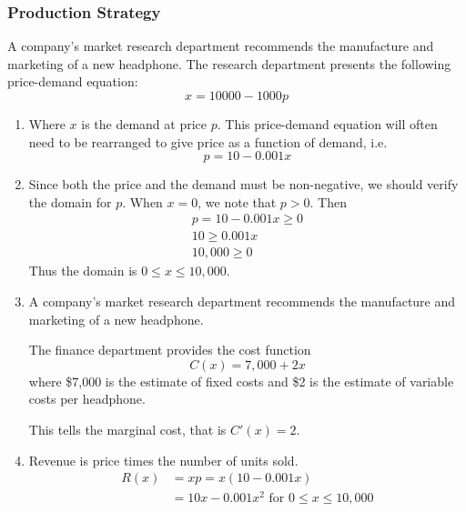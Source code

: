 \documentclass[14pt]{extarticle}
\begin{document}
\subsubsection{Production Strategy}
A company’s market research department recommends the manufacture and marketing of a new headphone. The research department presents the following price-demand equation:
$$x = 10000-1000p$$

\begin{enumerate}
\item Where $x$ is the demand at price $p$. This price-demand equation will often need to be rearranged to give price as a function of demand, i.e.
$$p = 10 - 0.001x$$

\item Since both the price and the demand must be non-negative, we should verify the domain for $p$. When $x=0$, we note that $p>0$. Then
\begin{align*}
	p= 10 - 0.001x \geq 0 \\
	10 \geq 0.001x \\
	10,000 \geq 0
\end{align*}
Thus the domain is $0\leq x \leq 10,000$.

\item A company’s market research department recommends the manufacture and marketing of a new headphone. 

The finance department provides the cost function
$$C(x) = 7,000 + 2x $$
where \$7,000 is the estimate of fixed costs and \$2 is the estimate of variable costs per headphone.

This tells the marginal cost, that is $C'(x) = 2$.


\item Revenue is price times the number of units sold.
\begin{align*}
	R(x) &= xp = x(10 - 0.001x) \\
	& = 10x - 0.001x^2 \text{ for } 0\leq x \leq 10,000
\end{align*}


\end{enumerate}
\end{document}
